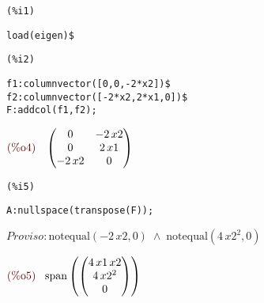 \noindent
\begin{minipage}[t]{8ex}
\color{red}\bf
\begin{verbatim}
(%i1) 
\end{verbatim}
\end{minipage}
\begin{minipage}[t]{\textwidth}
\color{blue}
\begin{verbatim}
load(eigen)$
\end{verbatim}
\end{minipage}

\smallskip

\noindent
\begin{minipage}[t]{8ex}
\color{red}\bf
\begin{verbatim}
(%i2) 
\end{verbatim}
\end{minipage}
\begin{minipage}[t]{\textwidth}
\color{blue}
\begin{verbatim}
f1:columnvector([0,0,-2*x2])$
f2:columnvector([-2*x2,2*x1,0])$
F:addcol(f1,f2);
\end{verbatim}
\end{minipage}
\begin{math}\displaystyle
\parbox{8ex}{\color{labelcolor}(\%o4) }
\begin{pmatrix}0 & -2\,x2\cr 0 & 2\,x1\cr -2\,x2 & 0\end{pmatrix}
\end{math}


\noindent
\begin{minipage}[t]{8ex}
\color{red}\bf
\begin{verbatim}
(%i5) 
\end{verbatim}
\end{minipage}
\begin{minipage}[t]{\textwidth}
\color{blue}
\begin{verbatim}
A:nullspace(transpose(F));
\end{verbatim}
\end{minipage}
\begin{math}\displaystyle
Proviso: \mathrm{notequal}\left( -2\,x2,0\right) \;\wedge\; \mathrm{notequal}\left( 4\,{x2}^{2},0\right) 
\end{math}

\noindent
\begin{math}\displaystyle
\parbox{8ex}{\color{labelcolor}(\%o5) }
\mathrm{span}\left( \begin{pmatrix}4\,x1\,x2\cr 4\,{x2}^{2}\cr 0\end{pmatrix}\right) 
\end{math}

